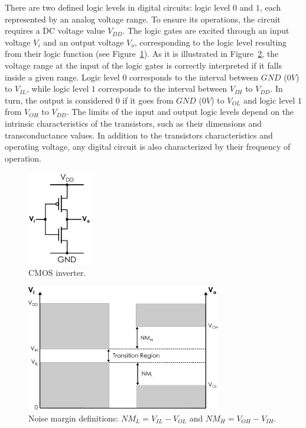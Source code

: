 There are two defined logic levels in digital circuits: logic level $0$ and $1$, each represented by an analog voltage range. To ensure its operations, the circuit requires a DC voltage value $V_{DD}$. The logic gates are excited through an input voltage $V_{i}$ and an output voltage $V_o$, corresponding to the logic level resulting from their logic function (see Figure~\ref{fig:cmos}). As it is illustrated in Figure~\ref{fig:cmos_noise_margin}, the voltage range at the input of the logic gates is correctly interpreted if it falls inside a given range. Logic level $0$ corresponds to the interval between $GND$ ($0V$) to $V_{IL}$, while logic level $1$ corresponds to the interval between $V_{IH}$ to $V_{DD}$. In turn, the output is considered $0$ if it goes from $GND$ ($0V$) to $V_{OL}$ and logic level $1$ from $V_{OH}$ to $V_{DD}$. The limits of the input and output logic levels depend on the intrinsic characteristics of the transistors, such as their dimensions and transconductance values. In addition to the transistors characteristics and operating voltage, any digital circuit is also characterized by their frequency of operation.

\begin{figure}[htb]
    \centering
    \includegraphics[width=30mm]{Figures/Background/cmos_inverter.pdf}
    \caption{CMOS inverter.}
    \label{fig:cmos}
\end{figure}

\begin{figure}[htb]
    \centering
    \includegraphics[width=85mm]{Figures/Background/voltage_margin.pdf}
    \caption{Noise margin definitions: $NM_L=V_{IL}-V_{OL}$ and $NM_H=V_{OH}-V_{IH}$.}
    \label{fig:cmos_noise_margin}
\end{figure}

